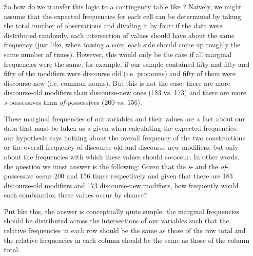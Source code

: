 So how do we transfer this logic to a contingency  table like ? Naively, we might assume that the expected  frequencies for each cell can be determined by taking the total number of observations and dividing it by four: if the data were distributed  randomly,  each intersection of values should have about the same frequency (just like, when tossing a coin, each side should come up roughly the same number of times). However, this would only be the case if all marginal frequencies  were the same, for example, if our sample contained fifty   and fifty  and fifty of the modifiers were discourse old (i.e. pronouns)  and fifty of them were discourse\hyp{}new (i.e. common nouns).  But this is not the case: there are more discourse\hyp{}old modifiers than discourse\hyp{}new ones (183 vs. 173) and there are more \textit{s}-possessives than \textit{of}-possessives (200 vs. 156).

These marginal frequencies of our variables and their values are a fact about our data that must be taken as a given when calculating the expected  frequencies: our hypothesis  says nothing about the overall frequency of the two constructions or the overall frequency  of discourse\hyp{}old and discourse\hyp{}new modifiers, but only about the frequencies with which these values should co\hyp{}occur. In other words, the question we must answer is the following: Given that the \textit{s}- and the \textit{of}-possessive  occur 200 and 156 times respectively and given that there are 183 discourse\hyp{}old modifiers and 173 discourse\hyp{}new modifiers, how frequently would each combination these values occur by  chance?

Put like this, the answer is conceptually quite simple: the marginal frequencies should be distributed  across the intersections of our variables such that the relative frequencies  in each row should be the same as those of the row total and the relative frequencies in each column should be the same as those of the column total.

